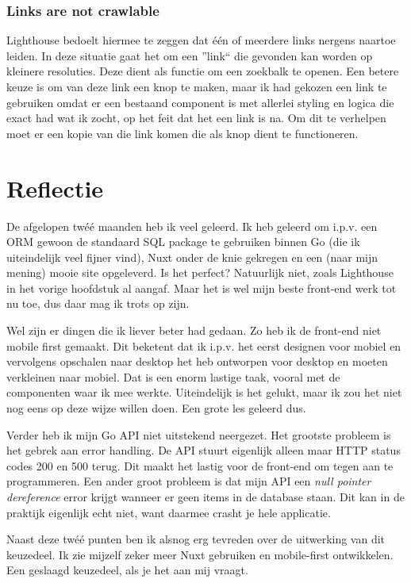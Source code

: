 \documentclass[a4paper]{report}
\begin{document}
    \subsection{Links are not crawlable}
    Lighthouse bedoelt hiermee te zeggen dat één of meerdere links nergens naartoe leiden. In deze situatie gaat het om een ''link``
    die gevonden kan worden op kleinere resoluties. Deze dient als functie om een zoekbalk te openen. Een betere keuze is om van deze link een knop te maken,
    maar ik had gekozen een link te gebruiken omdat er een bestaand component is met allerlei styling en logica die exact had wat ik zocht, op het feit dat het een
    link is na. Om dit te verhelpen moet er een kopie van die link komen die als knop dient te functioneren.

    \chapter{Reflectie}
    De afgelopen twéé maanden heb ik veel geleerd. Ik heb geleerd om i.p.v. een ORM gewoon de standaard SQL package te gebruiken binnen Go (die ik uiteindelijk veel fijner vind),
    Nuxt onder de knie gekregen en een (naar mijn mening) mooie site opgeleverd. Is het perfect? Natuurlijk niet, zoals Lighthouse in het vorige hoofdstuk al aangaf. Maar het is
    wel mijn beste front-end werk tot nu toe, dus daar mag ik trots op zijn.

    Wel zijn er dingen die ik liever beter had gedaan. Zo heb ik de front-end niet mobile first gemaakt. Dit beketent dat ik i.p.v. het eerst designen voor mobiel en vervolgens
    opschalen naar desktop het heb ontworpen voor desktop en moeten verkleinen naar mobiel. Dat is een enorm lastige taak, vooral met de componenten waar ik mee werkte.
    Uiteindelijk is het gelukt, maar ik zou het niet nog eens op deze wijze willen doen. Een grote les geleerd dus.

    Verder heb ik mijn Go API niet uitstekend neergezet. Het grootste probleem is het gebrek aan error handling. De API stuurt eigenlijk alleen maar HTTP status codes 200 en 500 terug.
    Dit maakt het lastig voor de front-end om tegen aan te programmeren. Een ander groot probleem is dat mijn API een \textit{null pointer dereference} error krijgt wanneer er geen
    items in de database staan. Dit kan in de praktijk eigenlijk echt niet, want daarmee crasht je hele applicatie.

    Naast deze twéé punten ben ik alsnog erg tevreden over de uitwerking van dit keuzedeel. Ik zie mijzelf zeker meer Nuxt gebruiken en mobile-first ontwikkelen.
    Een geslaagd keuzedeel, als je het aan mij vraagt.

    \printbibliography
\end{document}
